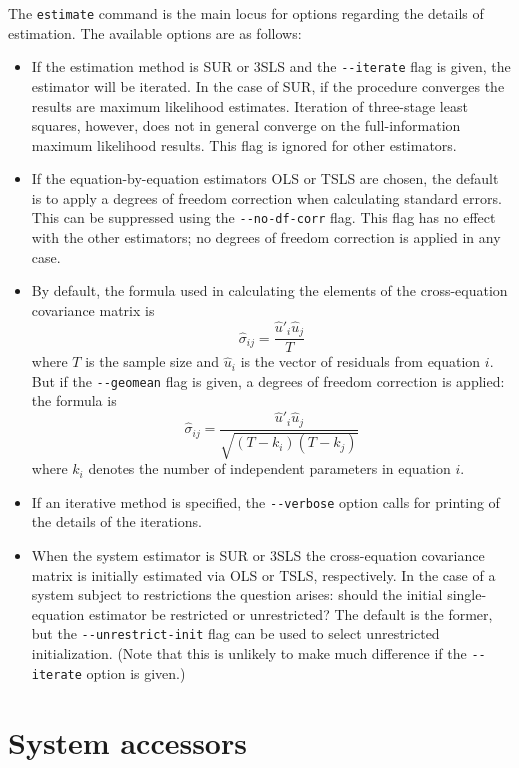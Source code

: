 The \texttt{estimate} command is the main locus for options regarding
the details of estimation. The available options are as follows:

\begin{itemize}
\item If the estimation method is SUR or 3SLS and the \verb|--iterate|
  flag is given, the estimator will be iterated. In the case of SUR,
  if the procedure converges the results are maximum likelihood
  estimates. Iteration of three-stage least squares, however, does not
  in general converge on the full-information maximum likelihood
  results. This flag is ignored for other estimators.
\item If the equation-by-equation estimators OLS or TSLS are chosen,
  the default is to apply a degrees of freedom correction when
  calculating standard errors. This can be suppressed using the
  \verb|--no-df-corr| flag. This flag has no effect with the other
  estimators; no degrees of freedom correction is applied in any case.
\item By default, the formula used in calculating the elements of the
  cross-equation covariance matrix is
\[
\hat{\sigma}_{ij} = \frac{\hat{u}'_i \hat{u}_j}{T}
\]
where $T$ is the sample size and $\hat{u}_i$ is the vector of
residuals from equation $i$. But if the \verb|--geomean| flag is
given, a degrees of freedom correction is applied: the formula is
\[
\hat{\sigma}_{ij} = \frac{\hat{u}'_i \hat{u}_j}{\sqrt{(T-k_i)(T-k_j)}}
\]
where $k_i$ denotes the number of independent parameters in equation
$i$.
\item If an iterative method is specified, the \verb|--verbose| option
  calls for printing of the details of the iterations.
\item When the system estimator is SUR or 3SLS the cross-equation
  covariance matrix is initially estimated via OLS or TSLS,
  respectively. In the case of a system subject to restrictions the
  question arises: should the initial single-equation estimator be
  restricted or unrestricted? The default is the former, but the
  \verb|--unrestrict-init| flag can be used to select unrestricted
  initialization. (Note that this is unlikely to make much difference
  if the \verb|--iterate| option is given.)
\end{itemize}

\section{System accessors}
\label{sec:sys-access}

